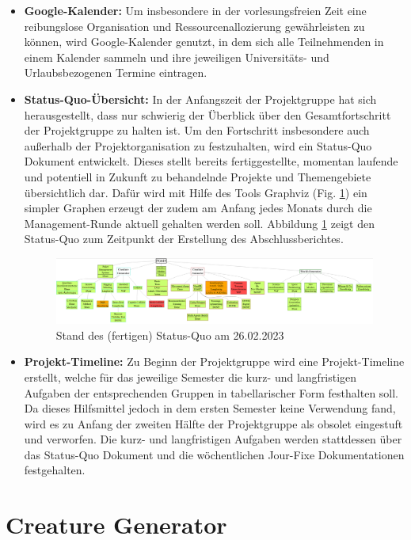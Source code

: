 \begin{itemize}
	\item \textbf{Google-Kalender: } Um insbesondere in der vorlesungsfreien Zeit eine reibungslose Organisation und Ressourcenallozierung gewährleisten zu können, wird Google-Kalender genutzt, in dem sich alle Teilnehmenden in einem Kalender sammeln und ihre jeweiligen Universitäts- und Urlaubsbezogenen Termine eintragen.
	\item \textbf{Status-Quo-Übersicht: } In der Anfangszeit der Projektgruppe hat sich herausgestellt, dass nur schwierig der Überblick über den Gesamtfortschritt der Projektgruppe zu halten ist. Um den Fortschritt insbesondere auch außerhalb der Projektorganisation zu festzuhalten, wird ein Status-Quo Dokument entwickelt. Dieses stellt bereits fertiggestellte, momentan laufende und potentiell in Zukunft zu behandelnde Projekte und Themengebiete übersichtlich dar. Dafür wird mit Hilfe des Tools Graphviz (Fig. \ref{fig:status-quo}) ein simpler Graphen erzeugt der zudem am Anfang jedes Monats durch die Management-Runde aktuell gehalten werden soll. Abbildung \ref{fig:status-quo} zeigt den Status-Quo zum Zeitpunkt der Erstellung des Abschlussberichtes.
	\begin{figure}
		\centering
		\includegraphics[width=0.7\linewidth]{resources/img/Graphviz_fin.png}
		\caption{Stand des (fertigen) Status-Quo am 26.02.2023}
		\label{fig:status-quo}
	\end{figure}
	\item \textbf{Projekt-Timeline: } Zu Beginn der Projektgruppe wird eine Projekt-Timeline erstellt, welche für das jeweilige Semester die kurz- und langfristigen Aufgaben der entsprechenden Gruppen in tabellarischer Form festhalten soll. Da dieses Hilfsmittel jedoch in dem ersten Semester keine Verwendung fand, wird es zu Anfang der zweiten Hälfte der Projektgruppe als obsolet eingestuft und verworfen. Die kurz- und langfristigen Aufgaben werden stattdessen über das Status-Quo Dokument und die wöchentlichen Jour-Fixe Dokumentationen festgehalten.
\end{itemize}



\section{Creature Generator}
\label{subsec:creature-generation-orga}

